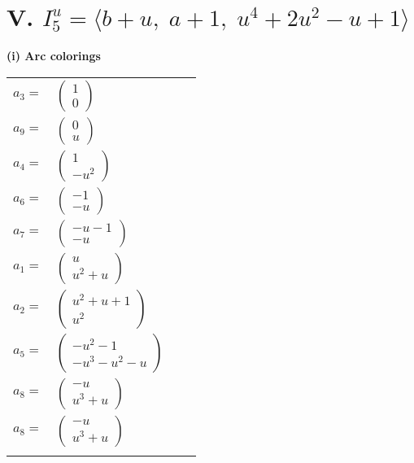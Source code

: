 \documentclass[1p]{elsarticle_modified}
\theoremstyle{definition}
\begin{document}
\centering \section*{V. $I^u_{5}= \langle b+u,\;a+1,\;u^4+2 u^2- u+1 \rangle$}
\flushleft \textbf{(i) Arc colorings}\\
\begin{tabular}{m{7pt} m{180pt} m{7pt} m{180pt} }
\flushright $a_{3}=$&$\begin{pmatrix}1\\0\end{pmatrix}$ \\
\flushright $a_{9}=$&$\begin{pmatrix}0\\u\end{pmatrix}$ \\
\flushright $a_{4}=$&$\begin{pmatrix}1\\- u^2\end{pmatrix}$ \\
\flushright $a_{6}=$&$\begin{pmatrix}-1\\- u\end{pmatrix}$ \\
\flushright $a_{7}=$&$\begin{pmatrix}- u-1\\- u\end{pmatrix}$ \\
\flushright $a_{1}=$&$\begin{pmatrix}u\\u^2+u\end{pmatrix}$ \\
\flushright $a_{2}=$&$\begin{pmatrix}u^2+u+1\\u^2\end{pmatrix}$ \\
\flushright $a_{5}=$&$\begin{pmatrix}- u^2-1\\- u^3- u^2- u\end{pmatrix}$ \\
\flushright $a_{8}=$&$\begin{pmatrix}- u\\u^3+u\end{pmatrix}$\\ \flushright $a_{8}=$&$\begin{pmatrix}- u\\u^3+u\end{pmatrix}$\\&\end{tabular}
\end{document}
